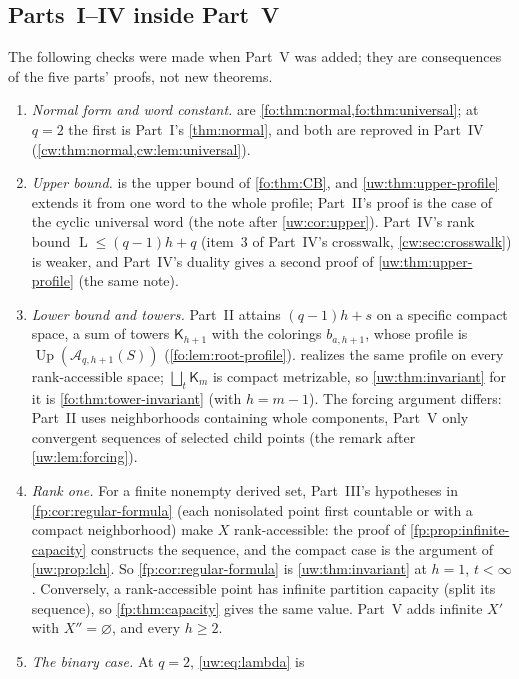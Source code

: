 \documentclass[11pt,letterpaper]{article}
\numberwithin{equation}{section}
\theoremstyle{definition}
\theoremstyle{remark}
\theoremstyle{definition}
\newcommand{\A}{\mathcal A}
\newcommand{\layers}{\operatorname{L}}
\newcommand{\Tw}{\mathsf K}
\begin{document}
\subsection{Parts~I--IV inside Part~V}
\label{uw:sec:crosswalk}
The following checks were made when Part~V was added; they are consequences
of the five parts' proofs, not new theorems.
\begin{enumerate}
\item \emph{Normal form and word constant.} 
are \cref{fo:thm:normal,fo:thm:universal}; at $q=2$ the first is Part~I's
\cref{thm:normal}, and both are reproved in Part~IV
(\cref{cw:thm:normal,cw:lem:universal}).
\item \emph{Upper bound.}  is the upper bound of
\cref{fo:thm:CB}, and \cref{uw:thm:upper-profile} extends it from one word
to the whole profile; Part~II's proof is the case of the cyclic universal
word (the note after \cref{uw:cor:upper}). Part~IV's rank bound
$\layers\le(q-1)h+q$ (item~3 of Part~IV's crosswalk, \cref{cw:sec:crosswalk}) is weaker, and Part~IV's duality gives a second
proof of \cref{uw:thm:upper-profile} (the same note).
\item \emph{Lower bound and towers.} Part~II attains $(q-1)h+s$ on a
specific compact space, a sum of towers $\Tw_{h+1}$ with the colorings
$b_{a,h+1}$, whose profile is $\operatorname{Up}(\A_{q,h+1}(S))$
(\cref{fo:lem:root-profile}).  realizes the same
profile on every rank-accessible space; $\bigsqcup_t\Tw_m$ is compact
metrizable, so \cref{uw:thm:invariant} for it is
\cref{fo:thm:tower-invariant} (with $h=m-1$). The forcing argument differs:
Part~II uses neighborhoods containing whole components, Part~V only
convergent sequences of selected child points (the remark after
\cref{uw:lem:forcing}).
\item \emph{Rank one.} For a finite nonempty derived set, Part~III's
hypotheses in \cref{fp:cor:regular-formula} (each nonisolated point first
countable or with a compact neighborhood) make $X$ rank-accessible: the
proof of \cref{fp:prop:infinite-capacity} constructs the sequence, and the
compact case is the argument of \cref{uw:prop:lch}. So
\cref{fp:cor:regular-formula} is \cref{uw:thm:invariant} at $h=1$, $t<\infty$.
Conversely, a rank-accessible point has infinite partition capacity (split
its sequence), so \cref{fp:thm:capacity} gives the same value. Part~V adds
infinite $X'$ with $X''=\varnothing$, and every $h\ge2$.
\item \emph{The binary case.} At $q=2$, \eqref{uw:eq:lambda} is

\end{enumerate}
\end{document}
